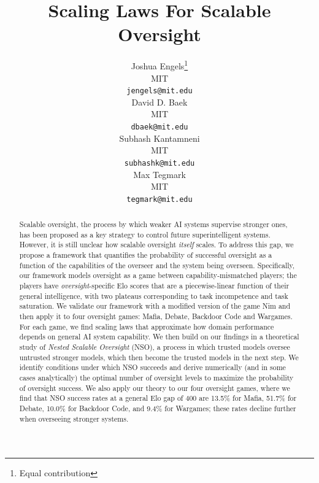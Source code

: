 \documentclass{article}
\title{Scaling Laws For Scalable Oversight } %
\author{%
  Joshua Engels\thanks{Equal contribution} \\
  MIT\\
  \texttt{jengels@mit.edu} \\
  \And
  David D. Baek\footnotemark[1] \\
  MIT \\
  \texttt{dbaek@mit.edu}\\
  \And 
  Subhash Kantamneni\footnotemark[1] \\
  MIT \\
  \texttt{subhashk@mit.edu}\\
  \And 
  Max Tegmark \\
  MIT \\
  \texttt{tegmark@mit.edu}\\
}
\begin{document}
\maketitle

\begin{abstract}
Scalable oversight, the process by which weaker AI systems supervise stronger ones, has been proposed as a key strategy to control future superintelligent systems. However, it is still unclear how scalable oversight \textit{itself} scales.
To address this gap, we propose a framework that quantifies the probability of successful oversight as a function of the capabilities of the overseer and the system being overseen.
Specifically, our framework models oversight as a game between capability-mismatched players; the players have \textit{oversight}-specific Elo scores that are a piecewise-linear function of their general intelligence, with two plateaus corresponding to task incompetence and task saturation. We validate our framework with a modified version of the game Nim and then apply it to four oversight games: Mafia,  Debate, Backdoor Code and Wargames. For each game, we find scaling laws that approximate how domain performance depends on general AI system capability. We then build on our findings in a theoretical study of \textit{Nested Scalable Oversight} (NSO), a process in which trusted models oversee untrusted stronger models, which then become the trusted models in the next step. We identify conditions under which NSO succeeds and derive numerically (and in some cases analytically) the optimal number of oversight levels to maximize the probability of oversight success. We also apply our theory to our four oversight games, where we find that NSO success rates at a general Elo gap of 400 are 13.5\% for Mafia, 51.7\% for Debate, 10.0\% for Backdoor Code, and 9.4\% for Wargames; these rates decline further when overseeing stronger systems.




\end{abstract}
\end{document}
